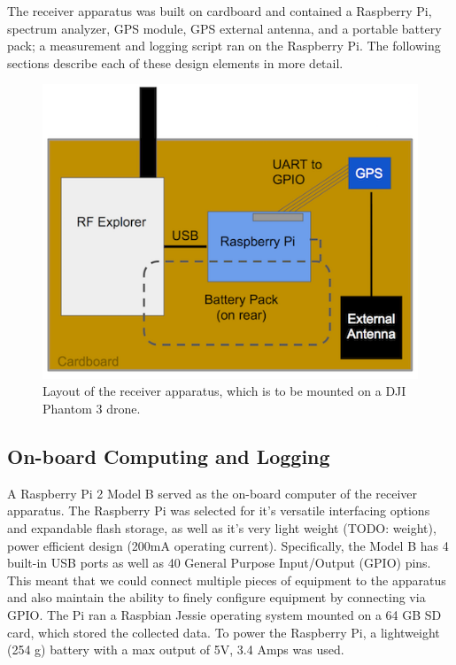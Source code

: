 \documentclass[pageno]{jpaper}
\begin{document}
The receiver apparatus was built on cardboard and contained a Raspberry Pi, spectrum analyzer, GPS module, GPS external antenna, and a portable battery pack; a measurement and logging script ran on the Raspberry Pi. The following sections describe each of these design elements in more detail.

\begin{figure}[h]
	\caption{Layout of the receiver apparatus, which is to be mounted on a DJI Phantom 3 drone.}
	\includegraphics{apparatus}
	\centering
\end{figure}

\subsection{On-board Computing and Logging}
A Raspberry Pi 2 Model B served as the on-board computer of the receiver apparatus. The Raspberry Pi was selected for it's versatile interfacing options and expandable flash storage, as well as it's very light weight (TODO: weight), power efficient design (200mA operating current). Specifically, the Model B has 4 built-in USB ports as well as 40 General Purpose Input/Output (GPIO) pins. This meant that we could connect multiple pieces of equipment to the apparatus and also maintain the ability to finely configure equipment by connecting via GPIO. The Pi ran a Raspbian Jessie operating system mounted on a 64 GB SD card, which stored the collected data. To power the Raspberry Pi, a lightweight (254 g) battery with a max output of 5V, 3.4 Amps was used. 
\end{document}
